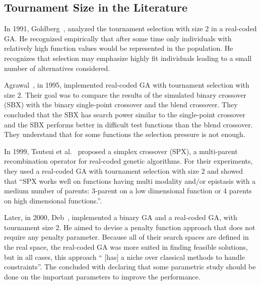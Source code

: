 \subsection{Tournament Size in the Literature}\label{sec:background:tournament_size} 

In 1991, Goldberg~\cite{goldberg1991real}, analyzed the tournament selection with size 2 in a real-coded GA. He recognized empirically that after some time only individuals with relatively high function values would be represented in the population. He recognizes that selection may emphasize highly fit individuals leading to a small number of alternatives considered.

Agrawal~\cite{agrawal1995simulated}, in 1995, implemented real-coded GA with tournament selection with size 2. Their goal was to compare the results of the simulated binary crossover (SBX) with the binary single-point crossover and the blend crossover. They concluded that the SBX has search power similar to the single-point crossover and the SBX performs better in difficult test functions than the blend crossover. They understand that for some functions the selection pressure is not enough.

In 1999, Tsutsui et al.~\cite{tsutsui1999multi} proposed a simplex crossover (SPX), a multi-parent recombination operator for real-coded genetic algorithms. For their experiments, they used a real-coded GA with tournament selection with size 2 and showed that ``SPX works well on functions having multi modality and/or epistasis with a medium number of parents: 3-parent on a low dimensional function or 4 parents on high dimensional functions.''. 

Later, in 2000, Deb~\cite{deb2000efficient}, implemented a binary GA and a real-coded GA, with tournament size 2. He aimed to devise a penalty function approach that does not require any penalty parameter. Because all of their search spaces are defined in the real space, the real-coded GA was more suited in finding feasible solutions, but in all cases, this approach `` [has] a niche over classical methods to handle constraints''. The concluded with declaring that some parametric study should be done on the important parameters to improve the performance.



